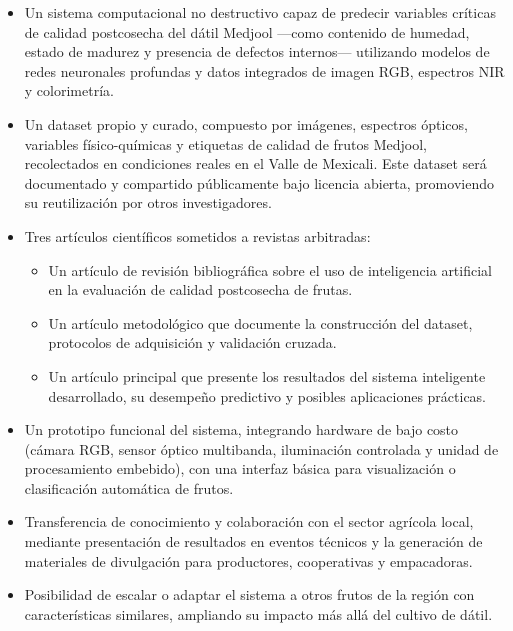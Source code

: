 \begin{itemize}
    \item Un sistema computacional no destructivo capaz de predecir variables críticas de calidad postcosecha del dátil Medjool —como contenido de humedad, estado de madurez y presencia de defectos internos— utilizando modelos de redes neuronales profundas y datos integrados de imagen RGB, espectros NIR y colorimetría.
    \item Un dataset propio y curado, compuesto por imágenes, espectros ópticos, variables físico-químicas y etiquetas de calidad de frutos Medjool, recolectados en condiciones reales en el Valle de Mexicali. Este dataset será documentado y compartido públicamente bajo licencia abierta, promoviendo su reutilización por otros investigadores.
    \item Tres artículos científicos sometidos a revistas arbitradas:
    \begin{itemize}
        \item Un artículo de revisión bibliográfica sobre el uso de inteligencia artificial en la evaluación de calidad postcosecha de frutas.
        \item Un artículo metodológico que documente la construcción del dataset, protocolos de adquisición y validación cruzada.
        \item Un artículo principal que presente los resultados del sistema inteligente desarrollado, su desempeño predictivo y posibles aplicaciones prácticas.
    \end{itemize}
    \item Un prototipo funcional del sistema, integrando hardware de bajo costo (cámara RGB, sensor óptico multibanda, iluminación controlada y unidad de procesamiento embebido), con una interfaz básica para visualización o clasificación automática de frutos.
    \item Transferencia de conocimiento y colaboración con el sector agrícola local, mediante presentación de resultados en eventos técnicos y la generación de materiales de divulgación para productores, cooperativas y empacadoras.
    \item Posibilidad de escalar o adaptar el sistema a otros frutos de la región con características similares, ampliando su impacto más allá del cultivo de dátil.
\end{itemize}